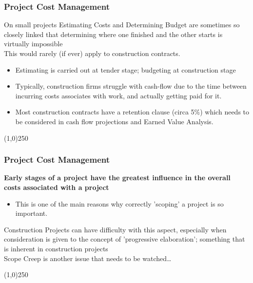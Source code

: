 \begin{frame}
\frametitle{Project Cost Management}
On small projects Estimating Costs and Determining Budget are sometimes so closely linked that determining where one finished and the other starts is virtually impossible\\
This would rarely (if ever) apply to construction contracts.
\begin{itemize}
	\item Estimating is carried out at tender stage; budgeting at construction stage
	\item Typically, construction firms struggle with cash-flow due to the time between incurring costs associates with work, and actually getting paid for it.
	\item Most construction contracts have a retention clause (circa 5\%) which needs to be considered in cash flow projections and Earned Value Analysis. 
\end{itemize}
\end{frame}
\begin{center}\line(1,0){250}\end{center}






\begin{frame}
\frametitle{Project Cost Management}
\textbf{Early stages of a project have the greatest influence in the overall costs associated with a project}
\begin{itemize}
	\item This is one of the main reasons why correctly 'scoping' a project is so important.
\end{itemize}
Construction Projects can have difficulty with this aspect, especially when consideration is given to the concept of 'progressive elaboration'; something that is inherent in construction projects\\
Scope Creep is another issue that needs to be watched\ldots
\end{frame}
\begin{center}\line(1,0){250}\end{center}






